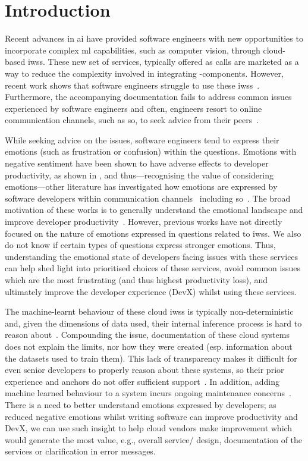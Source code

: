 \section{Introduction}
Recent advances in \gls{ai} have provided software engineers with new opportunities to incorporate complex \gls{ml} capabilities, such as computer vision, through cloud-based \glspl{iws}. These new set of services, typically offered as  calls are marketed as a way to reduce the complexity involved in integrating -components. However, recent work shows that software engineers struggle to use these \glspl{iws}~\citep{Cummaudo:2020icse}. 
Furthermore, the accompanying documentation fails to address common issues experienced by software engineers and often, engineers resort to online communication channels, such as \gls{so}, to seek advice from their peers~\citep{Cummaudo:2020icse}.

While seeking advice on the issues, software engineers tend to express their emotions (such as frustration or confusion) within the questions. Emotions with negative sentiment have been shown to have adverse effects to developer productivity, as shown in \citep{wrobel2013}, and thus---recognising the value of considering emotions---other literature has investigated how emotions are expressed by software developers within communication channels~\citep{ortu2016} including \gls{so}~\citep{novielli2018, calefato2018}. The broad motivation of these works is to generally understand the emotional landscape and improve developer productivity~\citep{murgia2014, ortu2016, gachechiladze2017}. However, previous works have not directly focused on the nature of emotions expressed in questions related to \glspl{iws}. We also do not know if certain types of questions express stronger emotions. Thus, understanding the emotional state of developers facing issues with these services can help shed light into prioritised choices of these services, avoid common issues which are the most frustrating (and thus highest productivity loss), and ultimately improve the developer experience (DevX) whilst using these services.

The machine-learnt behaviour of these cloud \glspl{iws} is typically non-deterministic and, given the dimensions of data used, their internal inference process is hard to reason about~\citep{Cummaudo:2019icsme}. Compounding the issue, documentation of these cloud systems does not explain the limits, nor how they were created (esp. information about the datasets used to train them). This lack of transparency makes it difficult for even senior developers to properly reason about these systems, so their prior experience and anchors do not offer sufficient support~\citep{Cummaudo:2020icse}. In addition, adding machine learned behaviour to a system incurs ongoing maintenance concerns~\citep{Sculley2015}. There is a need to better understand emotions expressed by developers; as reduced negative emotions whilst writing software can improve productivity \citep{wrobel2013} and DevX, we can use such insight to help cloud vendors make improvement which would generate the most value, e.g., overall service/ design, documentation of the services or clarification in error messages.

